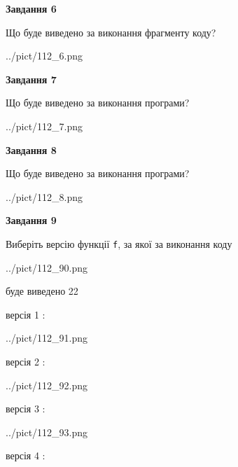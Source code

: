 \documentclass[12pt, ukrainian]{article}
\def\code#1{\Verb!#1!}
\begin{document}
{\begin {large}
{\begin {center}\textbf{Завдання 6}\end {center}}

Що буде виведено за виконання фрагменту коду?\par
\begin{center}
	{../pict/112_6.png}
\end{center}
\newpage

{\begin {center}\textbf{Завдання 7}\end {center}}

Що буде виведено за виконання програми?\par
\begin{center}
	{../pict/112_7.png}
\end{center}
\newpage

{\begin {center}\textbf{Завдання 8}\end {center}}

Що буде виведено за виконання програми?\par
\begin{center}
	{../pict/112_8.png}
\end{center}
\newpage

{\begin {center}\textbf{Завдання 9}\end {center}}

Виберіть версію функції \code{f}, за якої за виконання коду
\begin{center}
	{../pict/112_90.png}
\end{center}
буде виведено 22

\vspace{5mm}
версія 1 :

\begin{center}
	{../pict/112_91.png}
\end{center}
версія 2 :

\begin{center}
	{../pict/112_92.png}
\end{center}
версія 3 :

\begin{center}
	{../pict/112_93.png}
\end{center}
версія 4 :


\end{large}}
\end{document}

